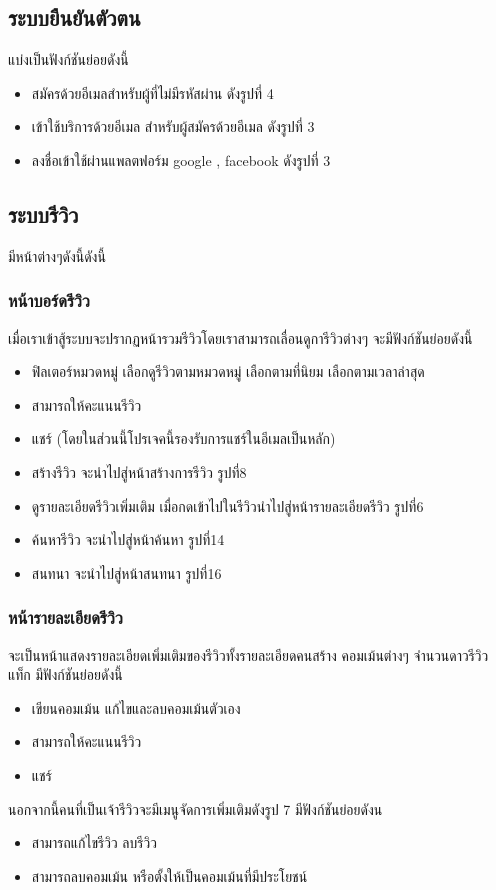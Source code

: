 \subsection{ระบบยืนยันตัวตน}
แบ่งเป็นฟังก์ชันย่อยดังนี้
\begin{itemize}
  \item สมัครด้วยอีเมลสำหรับผู้ที่ไม่มีรหัสผ่าน ดังรูปที่ 4
  \item เข้าใช้บริการด้วยอีเมล สำหรับผู้สมัครด้วยอีเมล ดังรูปที่ 3
  \item ลงชื่อเข้าใช้ผ่านแพลตฟอร์ม google , facebook ดังรูปที่ 3 
 \end{itemize}


\subsection{ระบบรีวิว}
มีหน้าต่างๆดังนี้ดังนี้

\subsubsection{หน้าบอร์ดรีวิว}
เมื่อเราเข้าสู้ระบบจะปรากฏหน้ารวมรีวิวโดยเราสามารถเลื่อนดูการีวิวต่างๆ จะมีฟังก์ชันย่อยดังนี้
\begin{itemize}
  \item ฟิลเตอร์หมวดหมู่ เลือกดูรีวิวตามหมวดหมู่ เลือกตามที่นิยม เลือกตามเวลาล่าสุด 
  \item สามารถให้คะแนนรีวิว 
  \item แชร์ (โดยในส่วนนี้โปรเจคนี้รองรับการแชร์ในอีเมลเป็นหลัก)
  \item สร้างรีวิว จะนำไปสู่หน้าสร้างการรีวิว รูปที่8
  \item ดูรายละเอียดรีวิวเพิ่มเติม เมื่อกดเข้าไปในรีวิวนำไปสู่หน้ารายละเอียดรีวิว รูปที่6
  \item ค้นหารีวิว จะนำไปสู่หน้าค้นหา รูปที่14
  \item สนทนา จะนำไปสู่หน้าสนทนา รูปที่16
 \end{itemize}


 \subsubsection{หน้ารายละเอียดรีวิว}
 จะเป็นหน้าแสดงรายละเอียดเพิ่มเติมของรีวิวทั้งรายละเอียดคนสร้าง คอมเม้นต่างๆ จำนวนดาวรีวิว แท็ก มีฟังก์ชันย่อยดังนี้
 \begin{itemize}
  \item เขียนคอมเม้น แก้ไขและลบคอมเม้นตัวเอง
  \item สามารถให้คะแนนรีวิว 
  \item แชร์ 
\end{itemize}
นอกจากนี้คนที่เป็นเจ้ารีวิวจะมีเมนูจัดการเพิ่มเติมดังรูป 7 มีฟังก์ชันย่อยดังน
\begin{itemize}
  \item สามารถแก้ไขรีวิว ลบรีวิว
  \item สามารถลบคอมเม้น หรือตั้งให้เป็นคอมเม้นที่มีประโยชน์
\end{itemize}


